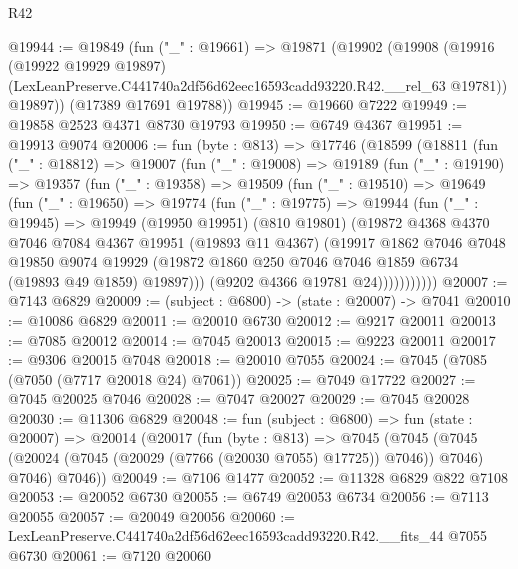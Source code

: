 \begin{lexlean}{R42}
\begin{coremodule}
{@19944 := @19849
    (fun ("_" : @19661) =>
    @19871
      (@19902
        (@19908
          (@19916
            (@19922 @19929 @19897)
            (LexLeanPreserve.C441740a2df56d62eec16593cadd93220.R42.__rel_63 @19781))
          @19897))
      (@17389 @17691 @19788))
@19945 := @19660 @7222
@19949 := @19858 @2523 @4371 @8730 @19793
@19950 := @6749 @4367
@19951 := @19913 @9074
@20006 := fun (byte : @813) =>
  @17746
    (@18599
      (@18811
        (fun ("_" : @18812) =>
        @19007
          (fun ("_" : @19008) =>
          @19189
            (fun ("_" : @19190) =>
            @19357
              (fun ("_" : @19358) =>
              @19509
                (fun ("_" : @19510) =>
                @19649
                  (fun ("_" : @19650) =>
                  @19774
                    (fun ("_" : @19775) =>
                    @19944
                      (fun ("_" : @19945) =>
                      @19949
                        (@19950 @19951)
                        (@810 @19801)
                        (@19872
                          @4368
                          @4370
                          @7046
                          @7084
                          @4367
                          @19951
                          (@19893 @11 @4367)
                          (@19917
                            @1862
                            @7046
                            @7048
                            @19850
                            @9074
                            @19929
                            (@19872 @1860 @250 @7046 @7046 @1859 @6734 (@19893 @49 @1859) @19897)))
                        (@9202 @4366 @19781 @24)))))))))))
@20007 := @7143 @6829
@20009 := (subject : @6800) -> (state : @20007) -> @7041
@20010 := @10086 @6829
@20011 := @20010 @6730
@20012 := @9217 @20011
@20013 := @7085 @20012
@20014 := @7045 @20013
@20015 := @9223 @20011
@20017 := @9306 @20015 @7048
@20018 := @20010 @7055
@20024 := @7045 (@7085 (@7050 (@7717 @20018 @24) @7061))
@20025 := @7049 @17722
@20027 := @7045 @20025 @7046
@20028 := @7047 @20027
@20029 := @7045 @20028
@20030 := @11306 @6829
@20048 := fun (subject : @6800) =>
  fun (state : @20007) =>
  @20014
    (@20017
      (fun (byte : @813) =>
      @7045
        (@7045 (@7045 (@20024 (@7045 (@20029 (@7766 (@20030 @7055) @17725)) @7046)) @7046) @7046)
        @7046))
@20049 := @7106 @1477
@20052 := @11328 @6829 @822 @7108
@20053 := @20052 @6730
@20055 := @6749 @20053 @6734
@20056 := @7113 @20055
@20057 := @20049 @20056
@20060 := LexLeanPreserve.C441740a2df56d62eec16593cadd93220.R42.__fits_44 @7055 @6730
@20061 := @7120 @20060
}
\end{coremodule}
\end{lexlean}

